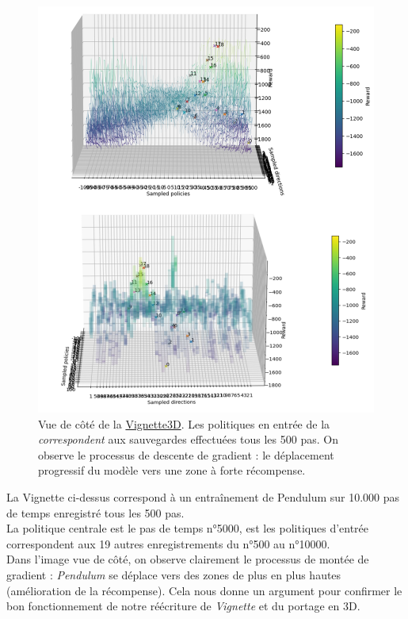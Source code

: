 \documentclass[12pt]{article}
\begin{document}
\begin{figure}[htp]
    \centering
    \includegraphics[width=15cm]{Images/vignette_cote}
    \caption{Vue de côté de la \hyperref[fig:vignette3D]{Vignette3D}. Les politiques en entrée de la \emph{correspondent} aux sauvegardes effectuées tous les 500 pas. On observe le processus de descente de gradient : le déplacement progressif du modèle vers une zone à forte récompense.}
    \label{fig:vignetteCote}
\end{figure}

La Vignette ci-dessus correspond à un entraînement de Pendulum sur 10.000 pas de temps enregistré tous les 500 pas. \\

La politique centrale est le pas de temps n°5000, est les politiques d'entrée correspondent aux 19 autres enregistrements du n°500 au n°10000. \\

Dans l'image vue de côté, on observe clairement le processus de montée de gradient : \emph{Pendulum} se déplace vers des zones de plus en plus hautes (amélioration de la récompense). Cela nous donne un argument pour confirmer le bon fonctionnement de notre réécriture de \emph{Vignette} et du portage en 3D.\\
\end{document}
